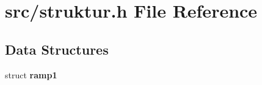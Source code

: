 \section{src/struktur.h File Reference}
\label{struktur_8h}
\subsection*{Data Structures}
\begin{DoxyCompactItemize}
\item 
struct \textbf{ ramp1}
\end{DoxyCompactItemize}
